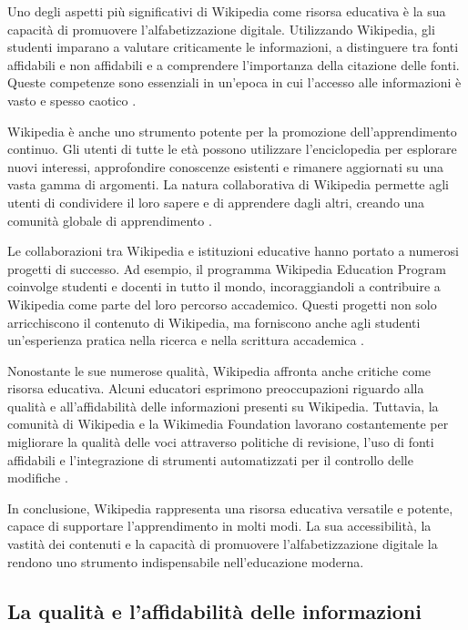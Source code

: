 \documentclass[12pt,a4paper]{report}
\begin{document}
Uno degli aspetti più significativi di Wikipedia come risorsa educativa è la sua capacità di promuovere l'alfabetizzazione digitale. Utilizzando Wikipedia, gli studenti imparano a valutare criticamente le informazioni, a distinguere tra fonti affidabili e non affidabili e a comprendere l'importanza della citazione delle fonti. Queste competenze sono essenziali in un'epoca in cui l'accesso alle informazioni è vasto e spesso caotico \cite{lih2009wikipedia}.

Wikipedia è anche uno strumento potente per la promozione dell'apprendimento continuo. Gli utenti di tutte le età possono utilizzare l'enciclopedia per esplorare nuovi interessi, approfondire conoscenze esistenti e rimanere aggiornati su una vasta gamma di argomenti. La natura collaborativa di Wikipedia permette agli utenti di condividere il loro sapere e di apprendere dagli altri, creando una comunità globale di apprendimento \cite{history_of_wikis}.

Le collaborazioni tra Wikipedia e istituzioni educative hanno portato a numerosi progetti di successo. Ad esempio, il programma Wikipedia Education Program coinvolge studenti e docenti in tutto il mondo, incoraggiandoli a contribuire a Wikipedia come parte del loro percorso accademico. Questi progetti non solo arricchiscono il contenuto di Wikipedia, ma forniscono anche agli studenti un'esperienza pratica nella ricerca e nella scrittura accademica \cite{jemielniak2014wikipedia}.

Nonostante le sue numerose qualità, Wikipedia affronta anche critiche come risorsa educativa. Alcuni educatori esprimono preoccupazioni riguardo alla qualità e all'affidabilità delle informazioni presenti su Wikipedia. Tuttavia, la comunità di Wikipedia e la Wikimedia Foundation lavorano costantemente per migliorare la qualità delle voci attraverso politiche di revisione, l'uso di fonti affidabili e l'integrazione di strumenti automatizzati per il controllo delle modifiche \cite{denning2005wikipedia}.

In conclusione, Wikipedia rappresenta una risorsa educativa versatile e potente, capace di supportare l'apprendimento in molti modi. La sua accessibilità, la vastità dei contenuti e la capacità di promuovere l'alfabetizzazione digitale la rendono uno strumento indispensabile nell'educazione moderna.

\subsection{La qualità e l'affidabilità delle informazioni}
\end{document}
